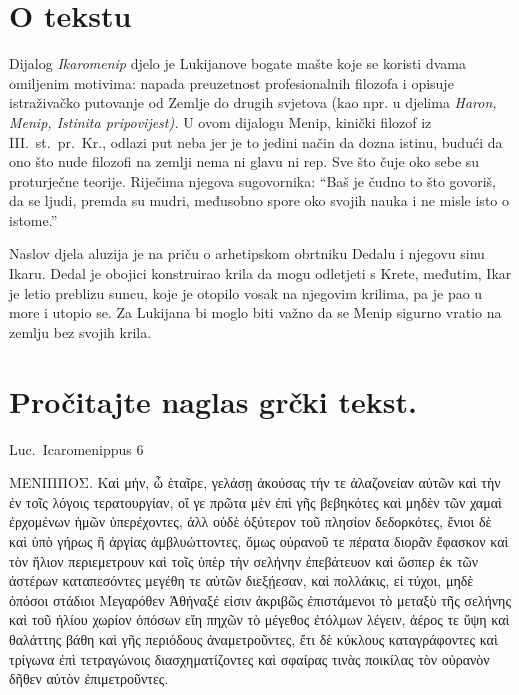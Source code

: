 


\section*{O tekstu}

Dijalog \textit{Ikaromenip} djelo je Lukijanove bogate mašte koje se koristi dvama omiljenim motivima: napada preuzetnost profesionalnih filozofa i opisuje istraživačko putovanje od Zemlje do drugih svjetova (kao npr. u djelima \textit{Haron, Menip, Istinita pripovijest).} U ovom dijalogu Menip, kinički filozof iz III.~st.\ pr.~Kr., odlazi put neba jer je to jedini način da dozna istinu, budući da ono što nude filozofi na zemlji nema ni glavu ni rep. Sve što čuje oko sebe su proturječne teorije. Riječima njegova sugovornika: ``Baš je čudno to što govoriš, da se ljudi, premda su mudri, međusobno spore oko svojih nauka i ne misle isto o istome.'' 

Naslov djela aluzija je na priču o arhetipskom obrtniku Dedalu i njegovu sinu Ikaru. Dedal je obojici konstruirao krila da mogu odletjeti s Krete, međutim, Ikar je letio preblizu suncu, koje je otopilo vosak na njegovim krilima, pa je pao u more i utopio se. Za Lukijana bi moglo biti važno da se Menip sigurno vratio na zemlju bez svojih krila.



\section*{Pročitajte naglas grčki tekst.}

Luc.\ Icaromenippus 6


\medskip


{\large

\begin{greek}

\noindent ΜΕΝΙΠΠΟΣ. Καὶ μήν, ὦ ἑταῖρε, γελάσῃ ἀκούσας τήν τε ἀλαζονείαν αὐτῶν καὶ τὴν ἐν τοῖς λόγοις τερατουργίαν, οἵ γε πρῶτα μὲν ἐπὶ γῆς βεβηκότες καὶ μηδὲν τῶν χαμαὶ ἐρχομένων ἡμῶν ὑπερέχοντες, ἀλλ οὐδὲ ὀξύτερον τοῦ πλησίον δεδορκότες, ἔνιοι δὲ καὶ ὑπὸ γήρως ἢ ἀργίας ἀμβλυώττοντες, ὅμως οὐρανοῦ τε πέρατα διορᾶν ἔφασκον καὶ τὸν ἥλιον περιεμετρουν καὶ τοῖς ὑπὲρ τὴν σελήνην ἐπεβάτευον καὶ ὥσπερ ἐκ τῶν ἀστέρων καταπεσόντες μεγέθη τε αὐτῶν διεξῄεσαν, καὶ πολλάκις, εἰ τύχοι, μηδὲ ὁπόσοι στάδιοι Μεγαρόθεν Ἀθήναξέ εἰσιν ἀκριβῶς ἐπιστάμενοι τὸ μεταξὺ τῆς σελήνης καὶ τοῦ ἡλίου χωρίον ὁπόσων εἴη πηχῶν τὸ μέγεθος ἐτόλμων λέγειν, ἀέρος τε ὕψη καὶ θαλάττης βάθη καὶ γῆς περιόδους ἀναμετροῦντες, ἔτι δὲ κύκλους καταγράφοντες καὶ τρίγωνα ἐπὶ τετραγώνοις διασχηματίζοντες καὶ σφαίρας τινὰς ποικίλας τὸν οὐρανὸν δῆθεν αὐτὸν ἐπιμετροῦντες.

\end{greek}

}



